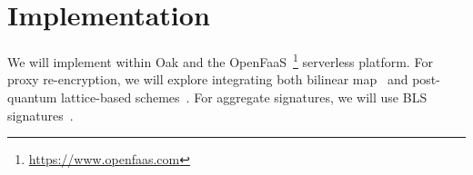 \section{Implementation}
\label{sec:implementation}

%
We will implement \SystemName within Oak and the
OpenFaaS~\footnote{\url{https://www.openfaas.com}} serverless platform.
%
For proxy re-encryption, we will explore integrating both bilinear
map~\cite{ 05-ndss-improved_proxy_reencryption} and post-quantum
lattice-based schemes~\cite{17-tops-fast_proxy_re_encryption}.
%
For aggregate signatures, we will use BLS
signatures~\cite{03-eurocrypt-aggregate_signatures_bilinear_maps,
03-pkc-threshold_multi_blind_signatures}.




